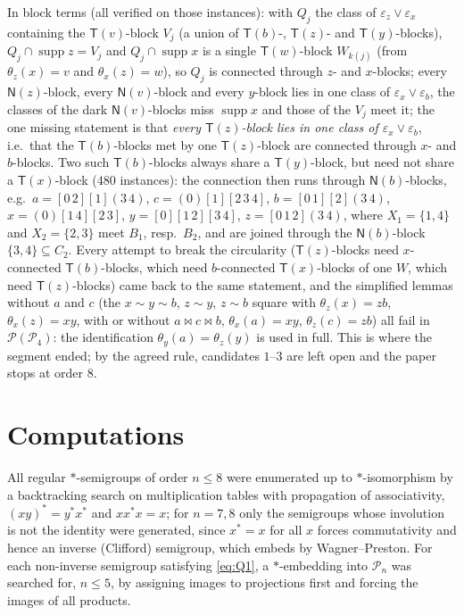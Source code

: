 \documentclass[11pt]{amsart}
\theoremstyle{definition}
\renewcommand{\P}{\mathcal{P}}
\newcommand{\supp}{\operatorname{supp}}
\newcommand{\T}{\mathsf{T}}
\newcommand{\N}{\mathsf{N}}
\newcommand{\mt}{\bowtie}   %
\begin{document}
In block terms (all verified on those instances): with $Q_j$ the class of $\varepsilon_z\vee\varepsilon_x$ containing the $\T(v)$-block $V_j$ (a union of $\T(b)$-, $\T(z)$- and $\T(y)$-blocks), $Q_j\cap\supp z=V_j$ and $Q_j\cap\supp x$ is a single $\T(w)$-block $W_{k(j)}$ (from $\theta_z(x)=v$ and $\theta_x(z)=w$), so $Q_j$ is connected through $z$- and $x$-blocks; every $\N(z)$-block, every $\N(v)$-block and every $y$-block lies in one class of $\varepsilon_x\vee\varepsilon_b$, the classes of the dark $\N(v)$-blocks miss $\supp x$ and those of the $V_j$ meet it; the one missing statement is that \emph{every $\T(z)$-block lies in one class of $\varepsilon_x\vee\varepsilon_b$}, i.e.\ that the $\T(b)$-blocks met by one $\T(z)$-block are connected through $x$- and $b$-blocks. Two such $\T(b)$-blocks always share a $\T(y)$-block, but need not share a $\T(x)$-block ($480$ instances): the connection then runs through $\N(b)$-blocks, e.g.\ $a=[0\,2][1](3\,4)$, $c=(0)[1][2\,3\,4]$, $b=[0\,1][2](3\,4)$, $x=(0)[1\,4][2\,3]$, $y=[0][1\,2][3\,4]$, $z=[0\,1\,2](3\,4)$, where $X_1=\{1,4\}$ and $X_2=\{2,3\}$ meet $B_1$, resp.\ $B_2$, and are joined through the $\N(b)$-block $\{3,4\}\subseteq C_2$. Every attempt to break the circularity ($\T(z)$-blocks need $x$-connected $\T(b)$-blocks, which need $b$-connected $\T(x)$-blocks of one $W$, which need $\T(z)$-blocks) came back to the same statement, and the simplified lemmas without $a$ and $c$ (the $x\sim y\sim b$, $z\sim y$, $z\sim b$ square with $\theta_z(x)=zb$, $\theta_x(z)=xy$, with or without $a\mt c\mt b$, $\theta_x(a)=xy$, $\theta_z(c)=zb$) all fail in $\P(\P_4)$: the identification $\theta_y(a)=\theta_z(y)$ is used in full. This is where the segment ended; by the agreed rule, candidates $1$--$3$ are left open and the paper stops at order $8$.

\section{Computations}\label{sec:comp}

All regular $*$-semigroups of order $n\le8$ were enumerated up to $*$-isomorphism by a backtracking search on multiplication tables with propagation of associativity, $(xy)^*=y^*x^*$ and $xx^*x=x$; for $n=7,8$ only the semigroups whose involution is not the identity were generated, since $x^*=x$ for all $x$ forces commutativity and hence an inverse (Clifford) semigroup, which embeds by Wagner--Preston. For each non-inverse semigroup satisfying \eqref{eq:Q1}, a $*$-embedding into $\P_n$ was searched for, $n\le5$, by assigning images to projections first and forcing the images of all products.
\end{document}
